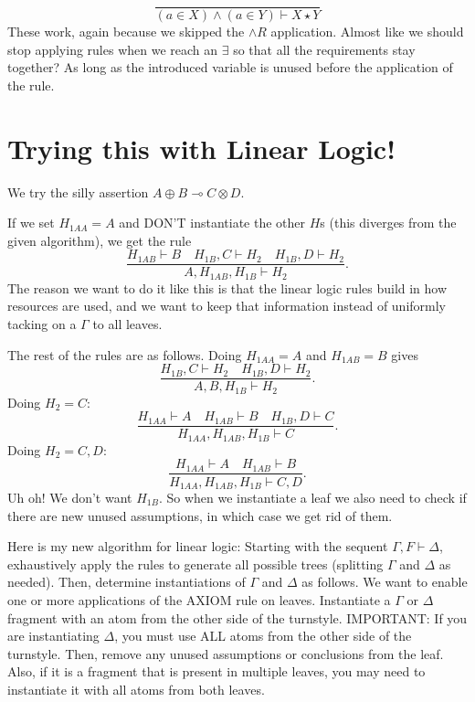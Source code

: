 \documentclass[12pt]{article}
\begin{document}
\[
    \frac{}{(a\in X)\wedge(a\in Y)\vdash X\star Y}
\]
These work, again because we skipped the $\wedge R$ application. Almost like we
should stop applying rules when we reach an $\exists$ so that all the
requirements stay together? As long as the introduced variable is unused before
the application of the rule.

\section{Trying this with Linear Logic!}

We try the silly assertion $A\oplus B\multimap C\otimes D$.
\begin{prooftree}

\end{prooftree}
If we set $H_{1AA}=A$ and DON'T instantiate the other $H$s (this diverges from
the given algorithm), we get the rule
\[
    \frac{H_{1AB}\vdash B\quad H_{1B},C\vdash H_2\quad H_{1B},D\vdash
    H_2}{A,H_{1AB},H_{1B}\vdash H_2}.
\]
The reason we want to do it like this is that the linear logic rules build in
how resources are used, and we want to keep that information instead of
uniformly tacking on a $\Gamma$ to all leaves.

The rest of the rules are as follows. Doing $H_{1AA}=A$ and $H_{1AB}=B$ gives
\[
    \frac{H_{1B},C\vdash H_2\quad H_{1B},D\vdash H_2}{A,B,H_{1B}\vdash H_2}.
\]
Doing $H_2=C$:
\[
    \frac{H_{1AA}\vdash A\quad H_{1AB}\vdash B\quad H_{1B},D\vdash
    C}{H_{1AA},H_{1AB},H_{1B}\vdash C}.
\]
Doing $H_2=C,D$:
\[
    \frac{H_{1AA}\vdash A\quad H_{1AB}\vdash B}{H_{1AA},H_{1AB},H_{1B}\vdash C,D}.
\]
Uh oh! We don't want $H_{1B}$. So when we instantiate a leaf we also need to
check if there are new unused assumptions, in which case we get rid of them.

Here is my new algorithm for linear logic: Starting with the sequent
$\Gamma,F\vdash\Delta$, exhaustively apply the rules to generate all possible
trees (splitting $\Gamma$ and $\Delta$ as needed). Then, determine
instantiations of $\Gamma$ and $\Delta$ as follows. We want to enable one or
more applications of the AXIOM rule on leaves. Instantiate a $\Gamma$ or
$\Delta$ fragment with an atom from the other side of the turnstyle. IMPORTANT:
If you are instantiating $\Delta$, you must use ALL atoms from the other side of
the turnstyle. Then, remove any unused assumptions or conclusions from the leaf.
Also, if it is a fragment that is present in multiple leaves, you may need to
instantiate it with all atoms from both leaves.
\end{document}

